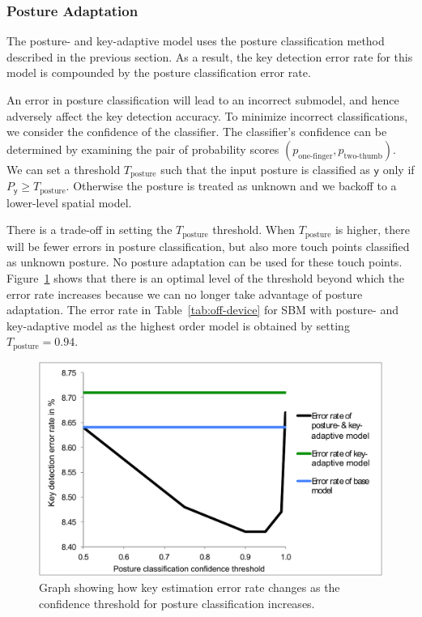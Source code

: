 \documentclass{sigchi}
\begin{document}
\subsubsection{Posture Adaptation}\label{sec:off-device-posture}
The posture- and key-adaptive model uses the posture classification
method described in the previous section. As a result, the
key detection error rate for this model is compounded by the posture
classification error rate. 

An error in posture classification will lead to an incorrect submodel,
and hence adversely affect the key detection accuracy. To minimize incorrect classifications, we consider the confidence of the classifier.  The classifier's confidence can be determined by examining the pair of probability 
scores $(p_{\text{one-finger}}, p_{\text{two-thumb}})$. 
We can set a threshold $T_{\text{posture}}$ such that the input posture is classified
as $\textsf{y}$ only if $P_\textsf{y} \ge T_{\text{posture}}$. Otherwise the posture is treated as
unknown and we backoff to a lower-level spatial model.

There is a trade-off in setting the $T_{\text{posture}}$ threshold. When
 $T_{\text{posture}}$ is higher, there will be fewer errors in posture classification, but also more touch points classified as unknown posture. No posture adaptation can be used for these touch points. Figure~\ref{fig:posture-confidence} 
 shows that there is an optimal level of the threshold beyond which the error rate
 increases because we can no longer take advantage of posture adaptation. The error rate in Table~\ref{tab:off-device} for SBM with posture- and key-adaptive model as the highest order model is obtained by setting $T_{\text{posture}} = 0.94$.

\begin{figure}[tb]
  \centering
  \includegraphics[width=1\columnwidth]{figures/chart2-embed-font.pdf}
  \caption{Graph showing how key estimation error rate changes as the confidence
  threshold for posture classification increases.}
  \label{fig:posture-confidence}
\end{figure}
\end{document}
